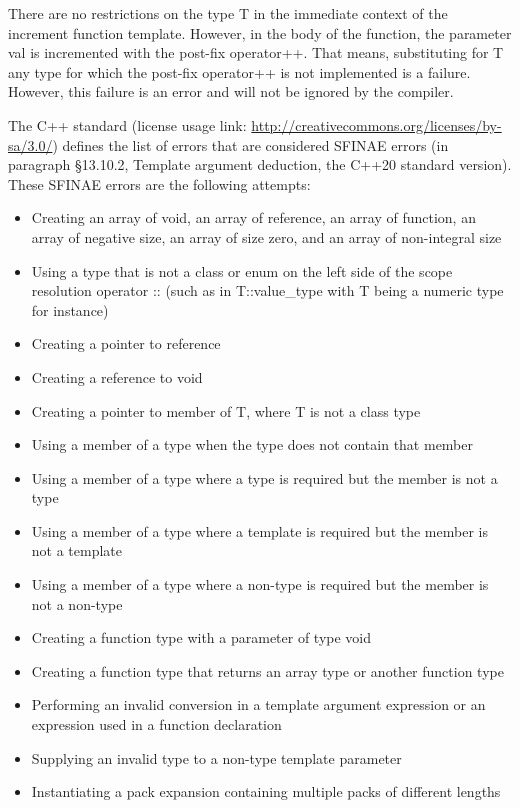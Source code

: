 There are no restrictions on the type T in the immediate context of the increment function template. However, in the body of the function, the parameter val is incremented with the post-fix operator++. That means, substituting for T any type for which the post-fix operator++ is not implemented is a failure. However, this failure is an error and will not be ignored by the compiler.

The C++ standard (license usage link: \url{http://creativecommons.org/licenses/by-sa/3.0/}) defines the list of errors that are considered SFINAE errors (in paragraph §13.10.2, Template argument deduction, the C++20 standard version). These SFINAE errors are the following attempts:


\begin{itemize}
\item
Creating an array of void, an array of reference, an array of function, an array of negative size, an array of size zero, and an array of non-integral size

\item
Using a type that is not a class or enum on the left side of the scope resolution operator :: (such as in T::value\_type with T being a numeric type for instance)

\item
Creating a pointer to reference

\item
Creating a reference to void

\item
Creating a pointer to member of T, where T is not a class type

\item
Using a member of a type when the type does not contain that member

\item
Using a member of a type where a type is required but the member is not a type

\item
Using a member of a type where a template is required but the member is not a template

\item
Using a member of a type where a non-type is required but the member is not a non-type

\item
Creating a function type with a parameter of type void

\item
Creating a function type that returns an array type or another function type

\item
Performing an invalid conversion in a template argument expression or an expression used in a function declaration

\item
Supplying an invalid type to a non-type template parameter

\item
Instantiating a pack expansion containing multiple packs of different lengths
\end{itemize}

